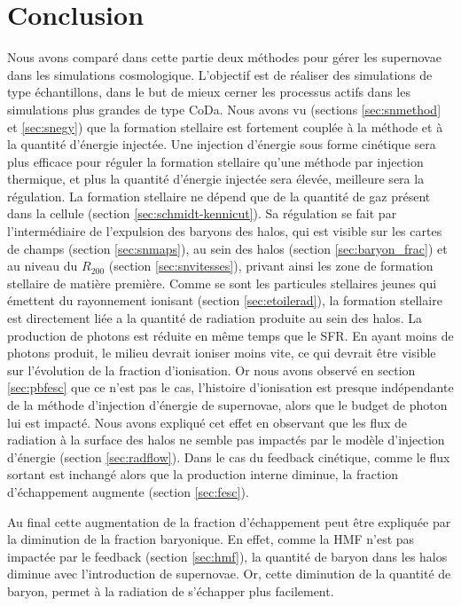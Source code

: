 \section{Conclusion}

Nous avons comparé dans cette partie deux méthodes pour gérer les supernovae dans les simulations cosmologique.
L'objectif est de réaliser des simulations de type échantillons, dans le but de mieux cerner les processus actifs dans les simulations plus grandes de type CoDa.
Nous avons vu (sections \ref{sec:snmethod} et \ref{sec:snegy}) que la formation stellaire est fortement couplée à la méthode et à la quantité d'énergie injectée.
Une injection d'énergie sous forme cinétique sera plus efficace pour réguler la formation stellaire qu'une méthode par injection thermique, et plus la quantité d'énergie injectée sera élevée, meilleure sera la régulation.
La formation stellaire ne dépend que de la quantité de gaz présent dans la cellule (section \ref{sec:schmidt-kennicut}).
Sa régulation se fait par l'intermédiaire de l'expulsion des baryons des halos, qui est visible sur les cartes de champs (section \ref{sec:snmaps}), au sein des halos (section \ref{sec:baryon_frac}) et au niveau du $R_{200}$ (section \ref{sec:snvitesses}), privant ainsi les zone de formation stellaire de matière première.
Comme se sont les particules stellaires jeunes qui émettent du rayonnement ionisant (section \ref{sec:etoilerad}), la formation stellaire est directement liée a la quantité de radiation produite au sein des halos.
La production de photons est réduite en même temps que le \ac{SFR}.
En ayant moins de photons produit, le milieu devrait ioniser moins vite, ce qui devrait être visible sur l'évolution de la fraction d'ionisation.
Or nous avons observé en section \ref{sec:pbfesc} que ce n'est pas le cas, l'histoire d'ionisation est presque indépendante de la méthode d'injection d'énergie de supernovae, alors que le budget de photon lui est impacté.
Nous avons expliqué cet effet en observant que les flux de radiation à la surface des halos ne semble pas impactés par le modèle d'injection d'énergie (section \ref{sec:radflow}).
Dans le cas du feedback cinétique, comme le flux sortant est inchangé alors que la production interne diminue, la fraction d'échappement augmente (section \ref{sec:fesc}).

Au final cette augmentation de la fraction d'échappement peut être expliquée par la diminution de la fraction baryonique.
En effet, comme la \ac{HMF} n'est pas impactée par le feedback (section \ref{sec:hmf}), la quantité de baryon dans les halos diminue avec l'introduction de supernovae.
Or, cette diminution de la quantité de baryon, permet à la radiation de s'échapper plus facilement.

